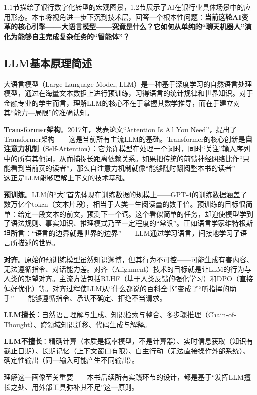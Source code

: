 1.1节描绘了银行数字化转型的宏观图景，1.2节展示了AI在银行业具体场景中的应用形态。本节将视角进一步下沉到技术层，回答一个根本性问题：\textbf{当前这轮AI变革的核心引擎——大语言模型——究竟是什么？它如何从单纯的``聊天机器人''演化为能够自主完成复杂任务的``智能体''？}

\subsection{LLM基本原理简述}

大语言模型（Large Language Model, LLM）是一种基于深度学习的自然语言处理模型，通过在海量文本数据上进行预训练，习得语言的统计规律和世界知识。对于金融专业的学生而言，理解LLM的核心不在于掌握其数学推导，而在于建立对其``能力—局限''的准确认知。

\textbf{Transformer架构}。2017年，\textcite{vaswani2017attention}发表论文``Attention Is All You Need''，提出了Transformer架构——这是当前所有主流LLM的基础。Transformer的核心创新是\textbf{自注意力机制}（Self-Attention）：它允许模型在处理一个词时，同时``关注''输入序列中的所有其他词，从而捕捉长距离依赖关系。如果把传统的前馈神经网络比作``只能看到当前页的读者''，那么自注意力机制就像``能够随时翻阅整本书的读者''——这正是LLM能够理解上下文的技术基础。

\textbf{预训练}。LLM的``大''首先体现在训练数据的规模上——GPT-4的训练数据涵盖了数万亿个token（文本片段），相当于人类一生阅读量的数千倍。预训练的目标很简单：给定一段文本的前文，预测下一个词。这个看似简单的任务，却迫使模型学到了语法规则、事实知识、推理模式乃至一定程度的``常识''。正如语言学家维特根斯坦所言：``语言的边界就是世界的边界''——LLM通过学习语言，间接地学习了语言所描述的世界。

\textbf{对齐}。原始的预训练模型虽然知识渊博，但其行为不可控——可能生成有害内容、无法遵循指令、对话能力差。对齐（Alignment）技术的目标就是让LLM的行为与人类的期望对齐。主流方法包括RLHF（基于人类反馈的强化学习）和DPO（直接偏好优化）等。对齐过程使LLM从``什么都说的百科全书''变成了``听指挥的助手''——能够遵循指令、承认不确定、拒绝不当请求。

\begin{theorybox}[LLM的“能力—局限”画像]
\textbf{LLM擅长}：自然语言理解与生成、知识检索与整合、多步骤推理（Chain-of-Thought）、跨领域知识迁移、代码生成与解释。

\textbf{LLM不擅长}：精确计算（本质是概率模型，不是计算器）、实时信息获取（知识有截止日期）、长期记忆（上下文窗口有限）、自主行动（无法直接操作外部系统）、确定性输出（同一输入可能产生不同输出）。

理解这一画像至关重要——本书后续所有实践环节的设计，都是基于``发挥LLM擅长之处、用外部工具弥补其不足''这一原则。
\end{theorybox}

